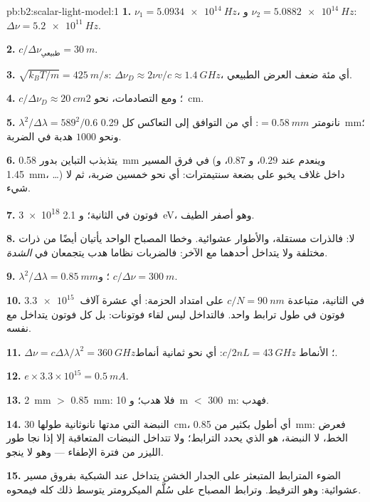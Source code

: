 \begin{solution}{pb:b2:scalar-light-model:1}
\textbf{1.} $\nu_1 = \qty{5.0934e14}{Hz}$، و $\nu_2 = \qty{5.0882e14}{Hz}$: $\Delta\nu = \qty{5.2e11}{Hz}$.

\textbf{2.} $c/\Delta\nu_{\text{طبيعي}} = \qty{30}{m}$.

\textbf{3.} $\sqrt{k_BT/m} = \qty{425}{m/s}$: $\Delta\nu_D \approx 2\nu v/c \approx \qty{1.4}{GHz}$، أي
مئة ضعف العرض الطبيعي.

\textbf{4.} $c/\Delta\nu_D \approx \qty{20}{cm}$؛ ومع التصادمات، نحو \qty{2}{cm}.

\textbf{5.} $\lambda^2/\Delta\lambda = 589^2/0.6$ نانومتر $= \qty{0.58}{mm}$: أي من التوافق إلى
التعاكس كل \qty{0.29}{mm}؛ ونحو $1000$ هدبة في الضربة.

\textbf{6.} يتذبذب التباين بدور \qty{0.58}{mm} في فرق
المسير (وينعدم عند $0.29$، و $0.87$، و \qty{1.45}{mm}، \dots) داخل غلاف
يخبو على بضعة سنتيمترات: أي نحو خمسين ضربة، ثم لا شيء.

\textbf{7.} \qty{3e18}{} فوتون في الثانية؛ و \qty{2.1}{eV}، وهو أصفر
الطيف.

\textbf{8.} لا: فالذرات مستقلة، والأطوار عشوائية. وخطا المصباح
الواحد يأتيان أيضًا من ذرات مختلفة ولا يتداخل أحدهما مع
الآخر: فالضربات نظاما هدب يتجمعان في \emph{الشدة}.

\textbf{9.} $\lambda^2/\Delta\lambda = \qty{0.85}{mm}$؛ و $c/\Delta\nu = \qty{300}{m}$.

\textbf{10.} $\qty{3.3e15}{}$ في الثانية، متباعدة $c/N = \qty{90}{nm}$ على امتداد الحزمة:
أي عشرة آلاف فوتون في طول ترابط واحد. فالتداخل ليس
لقاء فوتونات: بل كل فوتون يتداخل مع نفسه.

\textbf{11.} $\Delta\nu = c\Delta\lambda/\lambda^2 = \qty{360}{GHz}$؛  الأنماط $c/2nL = \qty{43}{GHz}$:
أي نحو ثمانية أنماط.

\textbf{12.} $e \times 3.3 \times 10^{15} = \qty{0.5}{mA}$.

\textbf{13.} \qty{2}{mm} $>$ \qty{0.85}{mm}: فلا هدب؛ و \qty{10}{m} $<$ \qty{300}{m}: فهدب.

\textbf{14.} النبضة التي مدتها نانوثانية طولها \qty{30}{cm}، أي أطول بكثير من
 \qty{0.85}{mm}: فعرض الخط، لا النبضة، هو الذي يحدد
الترابط؛ ولا تتداخل النبضات المتعاقبة إلا إذا نجا طور الليزر
من فترة الإطفاء --- وهو لا ينجو.

\textbf{15.} الضوء المترابط المتبعثر على الجدار الخشن يتداخل عند
الشبكية بفروق مسير عشوائية: وهو الترقيط. وترابط المصباح
على سُلَّم الميكرومتر يتوسط ذلك كله فيمحوه.


\end{solution}

